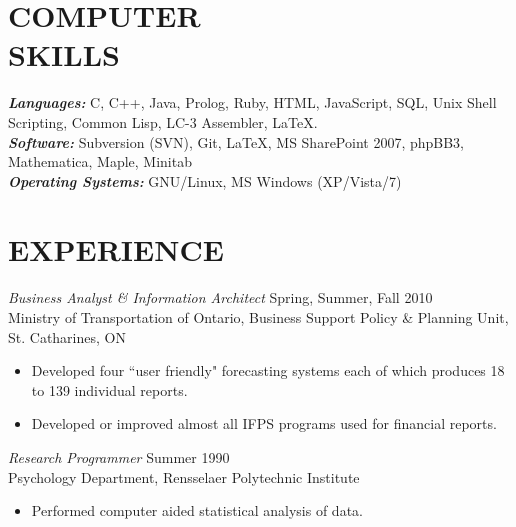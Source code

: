 \documentclass[margin]{res}
\begin{document}
\begin{resume}
\section{COMPUTER \\ SKILLS}
	{\sl \textbf{Languages:}} C, C++, Java, Prolog, Ruby, HTML,
	JavaScript, SQL, Unix Shell Scripting, Common Lisp, LC-3 Assembler, \LaTeX. \\
	{\sl \textbf{Software:}} Subversion (SVN), Git, LaTeX,
	MS SharePoint 2007, phpBB3, Mathematica, Maple, Minitab \\
	{\sl \textbf{Operating Systems:}} GNU/Linux, MS Windows (XP/Vista/7)
	 
\section{EXPERIENCE}
	{\sl Business Analyst \& Information Architect} \hfill Spring, Summer, Fall 2010 \\
    Ministry of Transportation of Ontario,
    Business Support Policy \& Planning Unit, St. Catharines, ON 
	\begin{itemize}  \itemsep -2pt %
    \item Developed four ``user friendly" forecasting systems each of
    which produces 18 to 139 individual reports. 
    \item Developed or improved almost all IFPS programs used for financial reports.
	\end{itemize}
	
	
	{\sl Research Programmer} \hfill Summer 1990 \\
    Psychology Department, Rensselaer Polytechnic Institute 
	\begin{itemize}  \itemsep -2pt %
    \item Performed computer aided statistical analysis of data. 
    \end{itemize} 
        

\end{resume}
\end{document}
